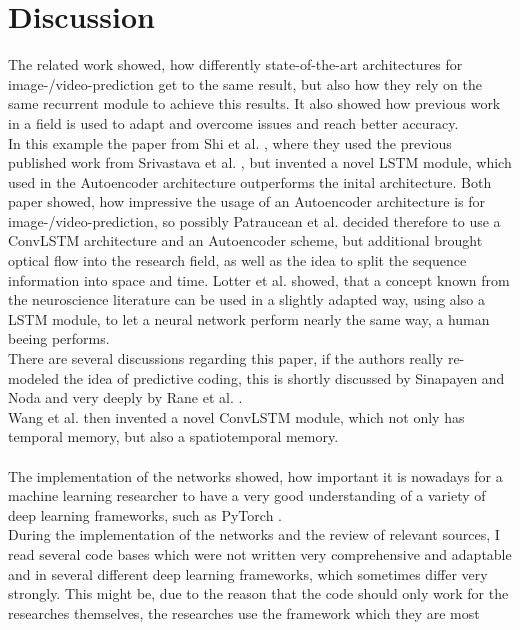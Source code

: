 \section{Discussion} \label{section::discussion}
 The related work showed, how differently state-of-the-art architectures for image-/video-prediction get to the same result, but also how they rely on the same
 recurrent module to achieve this results. It also showed how previous work in a field is used to adapt and overcome issues and reach better accuracy.\\
 In this example the paper from Shi et al. \cite{Shi2015}, where they used the previous published work from Srivastava et al. \cite{Srivastava2015}, but invented 
 a novel LSTM module, which used in the Autoencoder architecture outperforms the inital architecture. Both paper showed, how impressive the usage of an 
 Autoencoder architecture is for image-/video-prediction, so possibly Patraucean et al. \cite{Patraucean2015} decided therefore to use a ConvLSTM architecture and 
 an Autoencoder scheme, but additional brought optical flow into the research field, as well as the idea to split the sequence information into space and time. 
 Lotter et al. \cite{Lotter2016} showed, that a concept known from the neuroscience literature can be used in a slightly adapted way,
 using also a LSTM module, to let a neural network perform nearly the same way, a human beeing performs.\\There are several discussions regarding this paper, if
 the authors really re-modeled the idea of predictive coding, this is shortly discussed by Sinapayen and Noda \cite{Sinapayen2019} and very deeply by Rane et al. 
 \cite{Rane2019}.\\
 Wang et al. \cite{Wang2017} then invented a novel ConvLSTM module, which not only has temporal memory, but also a spatiotemporal memory.
 \\\\
 The implementation of the networks showed, how important it is nowadays for a machine learning researcher to have a very good understanding of a variety of deep 
 learning frameworks, such as PyTorch \cite{Paszke2019}.\\During the implementation of the networks and the review of relevant sources,
 I read several code bases which
 were not written very comprehensive and adaptable and in several different deep learning frameworks, which sometimes differ very strongly.
 This might be, due to the reason that the code should only work for the researches themselves, the researches use the framework which they are most
